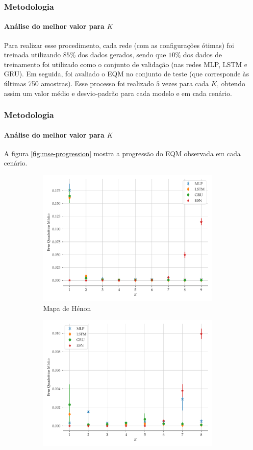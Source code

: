 \documentclass{beamer}
\begin{document}
\begin{frame}
\frametitle{Metodologia}
\framesubtitle{Análise do melhor valor para $K$}
\justifying 
Para realizar esse procedimento, cada rede (com as configurações ótimas) foi treinada utilizando $85\%$ dos dados gerados, sendo que $10\%$ dos dados de treinamento foi utilizado como o conjunto de validação (nas redes MLP, LSTM e GRU). Em seguida, foi avaliado o EQM no conjunto de teste (que corresponde às últimas 750 amostras). Esse processo foi realizado $5$ vezes para cada $K$, obtendo assim um valor médio e desvio-padrão para cada modelo e em cada cenário. 
\end{frame}

\begin{frame}
\frametitle{Metodologia}
\framesubtitle{Análise do melhor valor para $K$}
\justifying 
A figura \ref{fig:mse-progression} mostra a progressão do EQM observada em cada cenário. 
\begin{figure}[H]
     \begin{subfigure}[t]{0.4\textwidth} 
     \centering
         \includegraphics[scale=0.17]{progressao-k-henon.pdf}
         \caption{Mapa de Hénon}
     \end{subfigure}
     \centering
     \begin{subfigure}[t]{0.4\textwidth} 
     \centering
         \includegraphics[scale=0.17]{progressao-k-logistic.pdf}

\end{subfigure}
\end{figure}
\end{frame}
\end{document}
